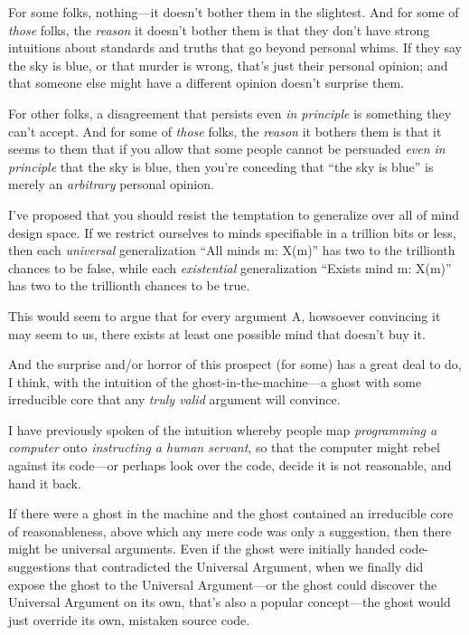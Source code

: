 {
 For some folks, nothing---it doesn't bother them
in the slightest. And for some of \textit{those} folks, the
\textit{reason} it doesn't bother them is that they
don't have strong intuitions about standards and truths
that go beyond personal whims. If they say the sky is blue, or that
murder is wrong, that's just their personal opinion;
and that someone else might have a different opinion
doesn't surprise them.}

{
 For other folks, a disagreement that persists even \textit{in
principle} is something they can't accept. And for some
of \textit{those} folks, the \textit{reason} it bothers them is that it
seems to them that if you allow that some people cannot be persuaded
\textit{even in principle} that the sky is blue, then
you're conceding that ``the sky is
blue'' is merely an \textit{arbitrary} personal
opinion.}

{
 I've proposed that you should resist the
temptation to generalize over all of mind design space. If we restrict
ourselves to minds specifiable in a trillion bits or less, then each
\textit{universal} generalization ``All minds m:
X(m)'' has two to the trillionth chances to be false,
while each \textit{existential} generalization
``Exists mind m: X(m)'' has two to
the trillionth chances to be true.}

{
 This would seem to argue that for every argument A, howsoever
convincing it may seem to us, there exists at least one possible mind
that doesn't buy it.}

{
 And the surprise and/or horror of this prospect (for some) has a
great deal to do, I think, with the intuition of the
ghost-in-the-machine---a ghost with some irreducible core that any
\textit{truly valid} argument will convince.}

{
 I have previously spoken of the intuition whereby people map
\textit{programming a computer} onto \textit{instructing a human
servant}, so that the computer might rebel against its code---or
perhaps look over the code, decide it is not reasonable, and hand it
back.}

{
 If there were a ghost in the machine and the ghost contained an
irreducible core of reasonableness, above which any mere code was only
a suggestion, then there might be universal arguments. Even if the
ghost were initially handed code-suggestions that contradicted the
Universal Argument, when we finally did expose the ghost to the
Universal Argument---or the ghost could discover the Universal Argument
on its own, that's also a popular concept---the ghost
would just override its own, mistaken source code.}

